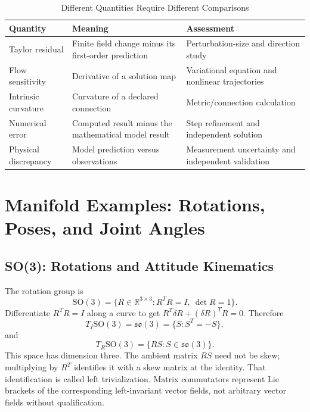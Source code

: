 \begin{table}[htbp]
\centering
\caption{Different Quantities Require Different Comparisons}
\label{tab:ch1:perspectives}
\begin{tabular}{@{}>{\raggedright\arraybackslash}p{.22\linewidth}>{\raggedright\arraybackslash}p{.36\linewidth}>{\raggedright\arraybackslash}p{.34\linewidth}@{}}
\toprule
Quantity & Meaning & Assessment \\
\midrule
Taylor residual & Finite field change minus its first-order prediction & Perturbation-size and direction study \\
Flow sensitivity & Derivative of a solution map & Variational equation and nonlinear trajectories \\
Intrinsic curvature & Curvature of a declared connection & Metric/connection calculation \\
Numerical error & Computed result minus the mathematical model result & Step refinement and independent solution \\
Physical discrepancy & Model prediction versus observations & Measurement uncertainty and independent validation \\
\bottomrule
\end{tabular}
\end{table}

\section{Manifold Examples: Rotations, Poses, and Joint Angles}

\subsection{SO(3): Rotations and Attitude Kinematics}

The rotation group is
\begin{equation}
\mathrm{SO}(3)=\{R\in\mathbb R^{3\times3}:R^TR=I,\ \det R=1\}.
\label{eq:ch1:SO3-def}
\end{equation}
Differentiate $R^TR=I$ along a curve to get $R^T\delta R+(\delta R)^TR=0$. Therefore
\begin{equation}
T_I\mathrm{SO}(3)=\mathfrak{so}(3)=\{S:S^T=-S\},
\label{eq:ch1:so3-tangent}
\end{equation}
and
\begin{equation}
T_R\mathrm{SO}(3)=\{RS:S\in\mathfrak{so}(3)\}.
\label{eq:ch1:SO3-tangent-at-R}
\end{equation}
This space has dimension three. The ambient matrix $RS$ need not be skew; multiplying
by $R^T$ identifies it with a skew matrix at the identity. That identification is called
left trivialization. Matrix commutators represent Lie brackets of the corresponding
left-invariant vector fields, not arbitrary vector fields without qualification.

